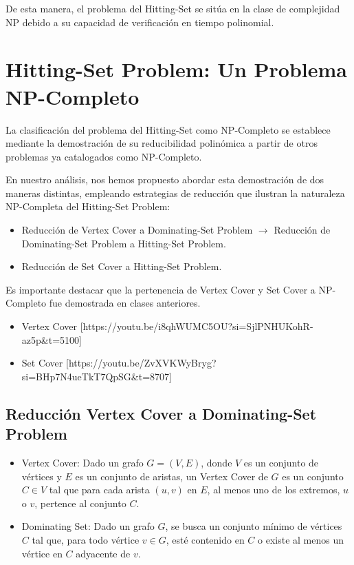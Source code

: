 De esta manera, el problema del Hitting-Set se sitúa en la clase de complejidad NP debido a su capacidad de verificación en tiempo polinomial. 

\section{Hitting-Set Problem: Un Problema NP-Completo}

La clasificación del problema del Hitting-Set como NP-Completo se establece mediante la demostración
de su reducibilidad polinómica a partir de otros problemas ya catalogados como NP-Completo. 

En nuestro análisis, nos hemos propuesto abordar esta demostración de dos maneras distintas, 
empleando estrategias de reducción que ilustran la naturaleza NP-Completa del Hitting-Set Problem:

\begin{itemize}
    \item Reducción de Vertex Cover a Dominating-Set Problem $\rightarrow$ Reducción de Dominating-Set Problem a Hitting-Set Problem.
    \item Reducción de Set Cover a Hitting-Set Problem.
\end{itemize}


Es importante destacar que la pertenencia de Vertex Cover y Set Cover a NP-Completo fue demostrada en clases anteriores.
\begin{itemize}
    \item  Vertex Cover [https://youtu.be/i8qhWUMC5OU?si=SjlPNHUKohR-az5p&t=5100]
    \item Set Cover [https://youtu.be/ZvXVKWyBryg?si=BHp7N4ueTkT7QpSG&t=8707]
\end{itemize}


\subsection{Reducción Vertex Cover a Dominating-Set Problem}

\begin{itemize}
    \item Vertex Cover: Dado un grafo $G=(V,E)$, donde $V$ es un conjunto de vértices y $E$ es un conjunto de aristas, un Vertex Cover de $G$ es un conjunto $C \in V$ tal que para cada arista $(u,v)$ en $E$, al menos uno de los extremos, $u$ o $v$, pertence al conjunto $C$.  
    \item Dominating Set: Dado un grafo $G$, se busca un conjunto mínimo de vértices $C$
    tal que, para todo vértice $v \in G$, esté contenido en $C$ o existe al menos un vértice en $C$ adyacente de $v$.
\end{itemize}

